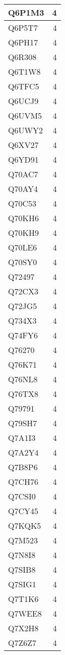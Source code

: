 \documentclass[
]{book}
\theoremstyle{definition}
\theoremstyle{definition}
\theoremstyle{definition}
\theoremstyle{definition}
\theoremstyle{remark}
\begin{document}
\begin{table}
\begin{tabular}{l|r}
\hline
Q6P1M3 & 4\\
\hline
Q6P5T7 & 4\\
\hline
Q6PH17 & 4\\
\hline
Q6R308 & 4\\
\hline
Q6T1W8 & 4\\
\hline
Q6TFC5 & 4\\
\hline
Q6UCJ9 & 4\\
\hline
Q6UVM5 & 4\\
\hline
Q6UWY2 & 4\\
\hline
Q6XV27 & 4\\
\hline
Q6YD91 & 4\\
\hline
Q70AC7 & 4\\
\hline
Q70AY4 & 4\\
\hline
Q70C53 & 4\\
\hline
Q70KH6 & 4\\
\hline
Q70KH9 & 4\\
\hline
Q70LE6 & 4\\
\hline
Q70SY0 & 4\\
\hline
Q72497 & 4\\
\hline
Q72CX3 & 4\\
\hline
Q72JG5 & 4\\
\hline
Q734X3 & 4\\
\hline
Q74FY6 & 4\\
\hline
Q76270 & 4\\
\hline
Q76K71 & 4\\
\hline
Q76NL8 & 4\\
\hline
Q76TX8 & 4\\
\hline
Q79791 & 4\\
\hline
Q79SH7 & 4\\
\hline
Q7A1I3 & 4\\
\hline
Q7A2Y4 & 4\\
\hline
Q7B8P6 & 4\\
\hline
Q7CH76 & 4\\
\hline
Q7CSI0 & 4\\
\hline
Q7CY45 & 4\\
\hline
Q7KQK5 & 4\\
\hline
Q7M523 & 4\\
\hline
Q7N8I8 & 4\\
\hline
Q7SIB8 & 4\\
\hline
Q7SIG1 & 4\\
\hline
Q7T1K6 & 4\\
\hline
Q7WEE8 & 4\\
\hline
Q7X2H8 & 4\\
\hline
Q7Z6Z7 & 4\\

\end{tabular}
\end{table}
\end{document}
